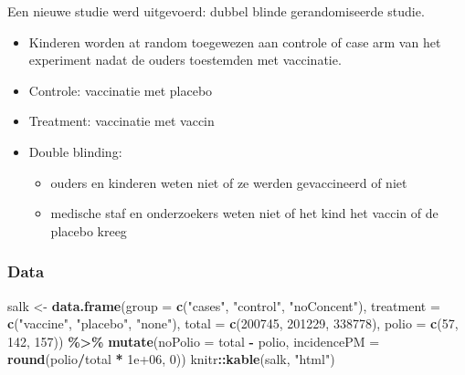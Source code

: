 \documentclass[
  12pt,dutch,coursenotes]{book}
\newenvironment{Shaded}{\begin{snugshade}}{\end{snugshade}}
\newcommand{\DataTypeTok}[1]{\textcolor[rgb]{0.13,0.29,0.53}{#1}}
\newcommand{\DecValTok}[1]{\textcolor[rgb]{0.00,0.00,0.81}{#1}}
\newcommand{\FloatTok}[1]{\textcolor[rgb]{0.00,0.00,0.81}{#1}}
\newcommand{\KeywordTok}[1]{\textcolor[rgb]{0.13,0.29,0.53}{\textbf{#1}}}
\newcommand{\NormalTok}[1]{#1}
\newcommand{\OperatorTok}[1]{\textcolor[rgb]{0.81,0.36,0.00}{\textbf{#1}}}
\newcommand{\StringTok}[1]{\textcolor[rgb]{0.31,0.60,0.02}{#1}}
\providecommand{\tightlist}{%
  \setlength{\itemsep}{0pt}\setlength{\parskip}{0pt}}
\theoremstyle{definition}
\theoremstyle{definition}
\theoremstyle{definition}
\theoremstyle{remark}
\begin{document}
Een nieuwe studie werd uitgevoerd: dubbel blinde gerandomiseerde studie.

\begin{itemize}
\tightlist
\item
  Kinderen worden at random toegewezen aan controle of case arm van het experiment nadat de ouders toestemden met vaccinatie.
\item
  Controle: vaccinatie met placebo
\item
  Treatment: vaccinatie met vaccin
\item
  Double blinding:

  \begin{itemize}
  \tightlist
  \item
    ouders en kinderen weten niet of ze werden gevaccineerd of niet
  \item
    medische staf en onderzoekers weten niet of het kind het vaccin of de placebo kreeg
  \end{itemize}
\end{itemize}

\hypertarget{data-1}{%
\subsubsection{Data}\label{data-1}}

\begin{Shaded}
\begin{Highlighting}[]
\NormalTok{salk \textless{}{-}}\StringTok{ }\KeywordTok{data.frame}\NormalTok{(}\DataTypeTok{group =} \KeywordTok{c}\NormalTok{(}\StringTok{"cases"}\NormalTok{, }\StringTok{"control"}\NormalTok{, }\StringTok{"noConcent"}\NormalTok{), }
    \DataTypeTok{treatment =} \KeywordTok{c}\NormalTok{(}\StringTok{"vaccine"}\NormalTok{, }\StringTok{"placebo"}\NormalTok{, }\StringTok{"none"}\NormalTok{), }\DataTypeTok{total =} \KeywordTok{c}\NormalTok{(}\DecValTok{200745}\NormalTok{, }
        \DecValTok{201229}\NormalTok{, }\DecValTok{338778}\NormalTok{), }\DataTypeTok{polio =} \KeywordTok{c}\NormalTok{(}\DecValTok{57}\NormalTok{, }\DecValTok{142}\NormalTok{, }\DecValTok{157}\NormalTok{)) }\OperatorTok{\%\textgreater{}\%}\StringTok{ }
\StringTok{    }\KeywordTok{mutate}\NormalTok{(}\DataTypeTok{noPolio =}\NormalTok{ total }\OperatorTok{{-}}\StringTok{ }\NormalTok{polio, }\DataTypeTok{incidencePM =} \KeywordTok{round}\NormalTok{(polio}\OperatorTok{/}\NormalTok{total }\OperatorTok{*}\StringTok{ }
\StringTok{        }\FloatTok{1e+06}\NormalTok{, }\DecValTok{0}\NormalTok{))}
\NormalTok{knitr}\OperatorTok{::}\KeywordTok{kable}\NormalTok{(salk, }\StringTok{"html"}\NormalTok{)}
\end{Highlighting}
\end{Shaded}
\end{document}
